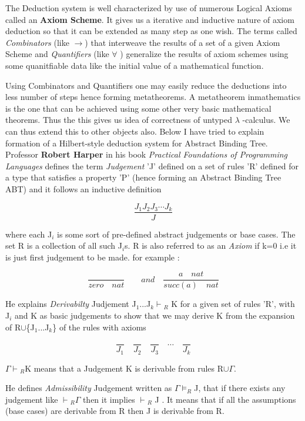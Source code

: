 The Deduction system is well characterized by use of numerous Logical Axioms called an \textbf{Axiom Scheme}. It gives us a iterative and inductive nature of axiom deduction so that it can be extended as many step as one wish. The terms called \textit{Combinators} (like $\rightarrow$) that interweave the results of a set of a given Axiom Scheme and \textit{Quantifiers} (like $\forall$ ) generalize the results of axiom schemes using some quanitfiable data like the initial value of a mathematical function. 

Using Combinators and Quantifiers one may easily reduce the deductions into less number of steps hence forming metatheorems. A metatheorem inmathematics is the one that can be achieved using some other very basic mathematical theorems. Thus the this gives us idea of correctness of untyped $\lambda$ -calculus. We can thus extend this to other objects also. Below I have tried to explain formation of a Hilbert-style deduction system for Abstract Binding Tree.\\     


Professor \textbf{Robert Harper} in his book \textit{Practical Foundations of Programming Languages}\cite{pfpl} defines the term \textit{Judgement} 'J' defined on a set of rules 'R' defined for a type that satisfies a property 'P' (hence forming an Abstract Binding Tree ABT) and it follows an inductive definition 

\[ \dfrac{J_1 J_2 J_3\cdots J_k}{J}\]

where each J$_i$ is some sort of pre-defined abstract judgements or base cases. The set R is a collection of all such J$_i$s. R is also referred to as an \textit{Axiom} if k=0 i.e it is just first judgement to be made. for example :

\[\dfrac{}{zero\quad nat} \quad \quad and \quad \dfrac{a\quad nat}{succ(a)\quad nat}  \]

He explains \textit{Derivabilty} Judjement J$_1$...J$_k$$\vdash$$_R$ K for a given set of rules 'R', with J$_i$ and K as basic judgements to show that we may derive K from the expansion of R$\cup$\{J$_1$...J$_k$\} of the rules with axioms 

\[ \dfrac{}{J_1} \quad \dfrac{}{J_2} \quad  \dfrac{}{J_3} \quad \cdots \quad \dfrac{}{J_k}   \]

$\Gamma\vdash$$_R$K means that a Judgement K is derivable from rules R$\cup\Gamma$.

He defines \textit{Admissibility} Judgement written as $\Gamma\models_R$J, that if there exists any judgement like $\vdash$$_R$$\Gamma$ then it implies $\vdash$$_R$ J . It means that if all the assumptions (base cases) are derivable from R then J is derivable from R.

